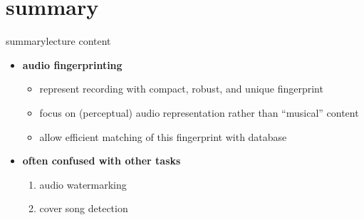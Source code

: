     \section{summary}
        \begin{frame}{summary}{lecture content}
            \begin{itemize}
                \item   \textbf{audio fingerprinting}
                    \begin{itemize}
                        \item   represent recording with compact, robust, and unique fingerprint
                        \item   focus on (perceptual) audio representation rather than ``musical'' content
                        \item   allow efficient matching of this fingerprint with database
                    \end{itemize}
                \bigskip
                \item   \textbf{often confused with other tasks}
                    \begin{enumerate}
                        \item   audio watermarking
                        \item   cover song detection
                    \end{enumerate}
            \end{itemize}
        \end{frame}

